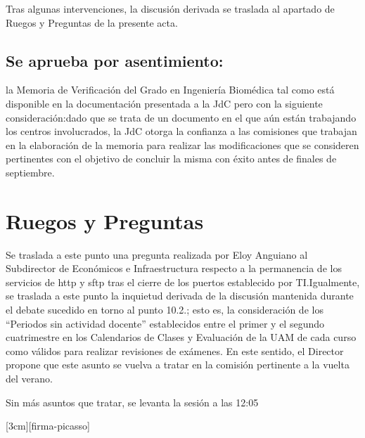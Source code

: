 \documentclass[numerado]{plantillasEPS} %
\begin{document}
Tras algunas intervenciones, la discusión derivada se traslada al apartado de Ruegos y Preguntas de la presente acta. 

\subsection{Se   aprueba   por   asentimiento:}   la Memoria   de   Verificación   del   Grado   en Ingeniería  Biomédica tal  como  está  disponible  en  la  documentación  presentada  a  la JdC pero con la siguiente consideración:dado que se trata de un documento en el que aún  están  trabajando  los  centros  involucrados,  la  JdC  otorga  la  confianza  a  las comisiones   que   trabajan en   la   elaboración   de   la   memoria   para   realizar   las modificaciones  que  se  consideren  pertinentes  con  el  objetivo  de  concluir  la  misma con éxito antes de finales de septiembre. 

\section{Ruegos y Preguntas}

Se  traslada  a  este  punto  una  pregunta  realizada  por  Eloy  Anguiano  al  Subdirector  de Económicos  e  Infraestructura respecto  a  la  permanencia  de  los  servicios  de  http  y  sftp tras el cierre de los puertos establecido por TI.Igualmente,  se  traslada  a  este  punto  la  inquietud  derivada  de  la discusión  mantenida durante  el  debate  sucedido  en  torno  al  punto  10.2.;  esto  es,  la  consideración  de  los “Periodos sin actividad docente” establecidos entre el primer y el segundo cuatrimestre en  los  Calendarios  de  Clases  y  Evaluación  de  la  UAM  de  cada  curso  como  válidos  para realizar  revisiones  de  exámenes. En  este  sentido,  el Director  propone que  este  asunto se vuelva a tratar en la comisión pertinente a la vuelta del verano. 

Sin más asuntos que tratar, se levanta la sesión a las 12:05


[3cm][firma-picasso]
\end{document}
